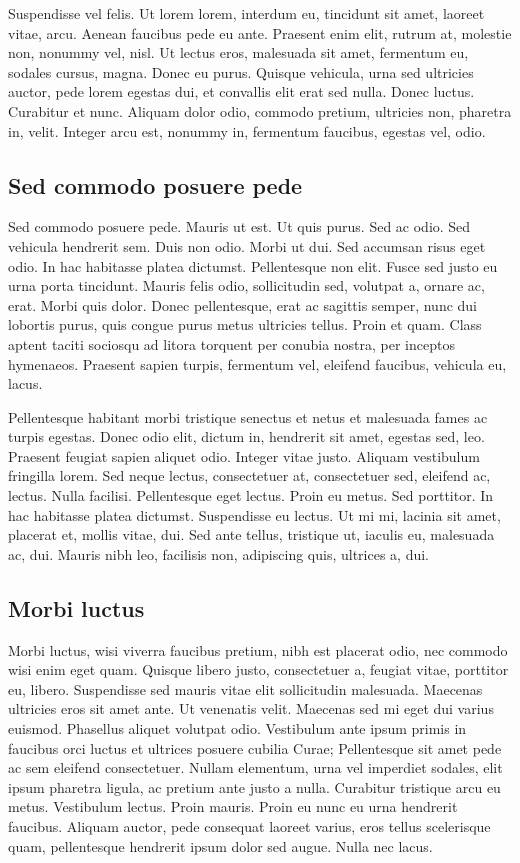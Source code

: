 Suspendisse vel felis. Ut lorem lorem, interdum eu, tincidunt sit
amet, laoreet vitae, arcu. Aenean faucibus pede eu ante. Praesent enim
elit, rutrum at, molestie non, nonummy vel, nisl. Ut lectus eros,
malesuada sit amet, fermentum eu, sodales cursus, magna. Donec eu
purus. Quisque vehicula, urna sed ultricies auctor, pede lorem egestas
dui, et convallis elit erat sed nulla. Donec luctus. Curabitur et
nunc. Aliquam dolor odio, commodo pretium, ultricies non, pharetra in,
velit. Integer arcu est, nonummy in, fermentum faucibus, egestas vel,
odio.

\subsection{Sed commodo posuere pede}

Sed commodo posuere pede. Mauris ut est. Ut quis purus. Sed ac odio.
Sed vehicula hendrerit sem. Duis non odio. Morbi ut dui. Sed accumsan
risus eget odio. In hac habitasse platea dictumst. Pellentesque non
elit.  Fusce sed justo eu urna porta tincidunt. Mauris felis odio,
sollicitudin sed, volutpat a, ornare ac, erat. Morbi quis dolor. Donec
pellentesque, erat ac sagittis semper, nunc dui lobortis purus, quis
congue purus metus ultricies tellus. Proin et quam. Class aptent
taciti sociosqu ad litora torquent per conubia nostra, per inceptos
hymenaeos. Praesent sapien turpis, fermentum vel, eleifend faucibus,
vehicula eu, lacus.

Pellentesque habitant morbi tristique senectus et netus et malesuada
fames ac turpis egestas. Donec odio elit, dictum in, hendrerit sit
amet, egestas sed, leo. Praesent feugiat sapien aliquet odio. Integer
vitae justo.  Aliquam vestibulum fringilla lorem. Sed neque lectus,
consectetuer at, consectetuer sed, eleifend ac, lectus. Nulla
facilisi. Pellentesque eget lectus. Proin eu metus. Sed porttitor. In
hac habitasse platea dictumst. Suspendisse eu lectus. Ut mi mi,
lacinia sit amet, placerat et, mollis vitae, dui. Sed ante tellus,
tristique ut, iaculis eu, malesuada ac, dui. Mauris nibh leo,
facilisis non, adipiscing quis, ultrices a, dui.

\subsection{Morbi luctus}

Morbi luctus, wisi viverra faucibus pretium, nibh est placerat odio,
nec commodo wisi enim eget quam. Quisque libero justo, consectetuer a,
feugiat vitae, porttitor eu, libero. Suspendisse sed mauris vitae elit
sollicitudin malesuada. Maecenas ultricies eros sit amet ante. Ut
venenatis velit. Maecenas sed mi eget dui varius euismod. Phasellus
aliquet volutpat odio. Vestibulum ante ipsum primis in faucibus orci
luctus et ultrices posuere cubilia Curae; Pellentesque sit amet pede
ac sem eleifend consectetuer. Nullam elementum, urna vel imperdiet
sodales, elit ipsum pharetra ligula, ac pretium ante justo a
nulla. Curabitur tristique arcu eu metus. Vestibulum lectus. Proin
mauris. Proin eu nunc eu urna hendrerit faucibus. Aliquam auctor, pede
consequat laoreet varius, eros tellus scelerisque quam, pellentesque
hendrerit ipsum dolor sed augue. Nulla nec lacus.

